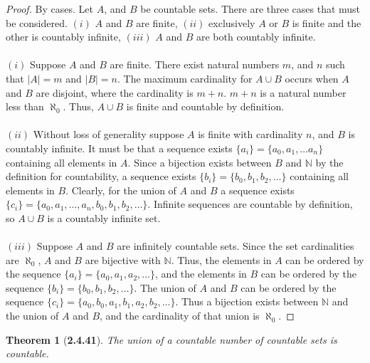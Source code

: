 \documentclass[a4paper, 12pt]{article}
\theoremstyle{plain}
\newtheorem*{theorem*}{Theorem}
\begin{document}
\begin{proof}
    By cases. Let $A$, and $B$ be countable sets. There are three cases that must be considered. 
    $(i)$ $A$ and $B$ are finite, $(ii)$ exclusively $A$ or $B$ is finite and the other is 
    countably infinite, $(iii)$ $A$ and $B$ are both countably infinite.
    \\ \\
    $(i)$ Suppose $A$ and $B$ are finite. There exist natural numbers $m$, and $n$ such that 
    $|A| = m$ and $|B| = n$. The maximum cardinality for $A \cup B$ occurs when $A$ and $B$ are 
    disjoint, where the cardinality is $m + n$. $m+n$ is a natural number less than $\aleph_0$. 
    Thus, $A \cup B$ is finite and countable by definition. 
    \\ \\
    $(ii)$ Without loss of generality suppose $A$ is finite with cardinality $n$, and $B$ is 
    countably infinite. It must be that a sequence exists $\{a_i\} = \{a_0, a_1, \dots a_n\}$ 
    containing all elements in $A$. Since a bijection exists between $B$ and $\mathbb{N}$ by the 
    definition for countability, a sequence exists $\{b_i\} = \{b_0, b_1, b_2, \dots \}$ containing 
    all elements in $B$. Clearly, for the union of $A$ and $B$ a sequence exists 
    $\{c_i\} = \{a_0, a_1, \dots, a_n, b_0, b_1, b_2, \dots \}$. Infinite sequences are countable 
    by definition, so $A \cup B$ is a countably infinite set.
    \\ \\
    $(iii)$ Suppose $A$ and $B$ are infinitely countable sets. Since the set cardinalities are 
    $\aleph_0$, $A$ and $B$ are bijective with $\mathbb{N}$. Thus, the elements in $A$ can be 
    ordered by the sequence $\{a_i\} = \{a_0, a_1, a_2, \dots\}$, and the elements in $B$ can be 
    ordered by the sequence $\{b_i\} = \{b_0, b_1, b_2, \dots \}$. The union of $A$ and $B$ can be 
    ordered by the sequence $\{c_i\} = \{a_0, b_0, a_1, b_1, a_2, b_2, \dots\}$. Thus a bijection 
    exists between $\mathbb{N}$ and the union of $A$ and $B$, and the cardinality of that union is 
    $\aleph_0$.
\end{proof}

\pagebreak


\begin{theorem*}[\textbf{2.4.41}]
    The union of a countable number of countable sets is countable.
\end{theorem*}
\end{document}
